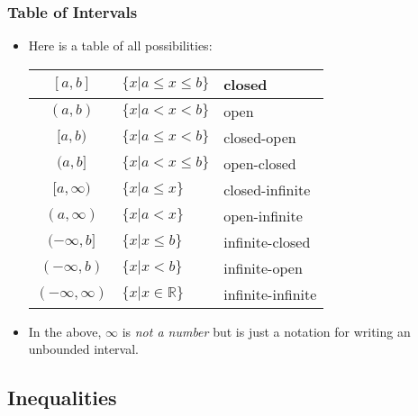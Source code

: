 \documentclass[serif,ignorenonframetext]{beamer}
\newcommand{\lt}{<}
\begin{document}
\begin{frame}
  \frametitle{Table of Intervals}
  \begin{itemize}[<+->]
  \item Here is a table of all possibilities:
    \begin{tabular}{|c|l|l|}
      \hline
      $[a,b]$            & $\{x|a\le x \le b\}$      & closed             \\
      \hline
      $(a,b)$            & $\{x|a\lt x \lt b\}$      & open               \\
      \hline
      $[a,b)$            & $\{x|a\le x \lt b\}$      & closed-open        \\
      \hline
      $(a,b]$            & $\{x|a\lt x \le b\}$      & open-closed        \\
      \hline
      $[a,\infty)$       & $\{x|a\le x      \}$      & closed-infinite    \\
      \hline
      $(a,\infty)$       & $\{x|a\lt x      \}$      & open-infinite      \\
      \hline
      $(-\infty,b]$      & $\{x|     x \le b\}$      & infinite-closed    \\
      \hline
      $(-\infty,b)$      & $\{x|     x \lt b\}$      & infinite-open      \\
      \hline
      $(-\infty,\infty)$ & $\{x| x\in{\mathbb R} \}$ & infinite-infinite  \\
      \hline
    \end{tabular}
  \item In the above, $\infty$ is \textit{not a number} but is just a notation
    for writing an unbounded interval.
  \end{itemize}
\end{frame}

\subsection{Inequalities}
\end{document}
